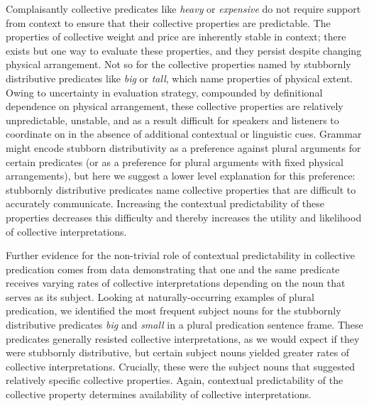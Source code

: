 \documentclass[linguex]{sp}
\begin{document}
Complaisantly collective predicates like \emph{heavy} or \emph{expensive} do not require support from context to ensure that their collective properties are predictable. The properties of collective weight and price are inherently stable in context; there exists but one way to evaluate these properties, and they persist despite changing physical arrangement. Not so for the collective properties named by stubbornly distributive predicates like \emph{big} or \emph{tall}, which name properties of physical extent. Owing to uncertainty in evaluation strategy, compounded by definitional dependence on physical arrangement, these collective properties are relatively unpredictable, unstable, and as a result difficult for speakers and listeners to coordinate on in the absence of additional contextual or linguistic cues. Grammar might encode stubborn distributivity as a preference against plural arguments for certain predicates (or as a preference for plural arguments with fixed physical arrangements), but here we suggest a lower level explanation for this preference: stubbornly distributive predicates name collective properties that are difficult to accurately communicate. Increasing the contextual predictability of these properties decreases this difficulty and thereby increases the utility and likelihood of collective interpretations.

Further evidence for the non-trivial role of contextual predictability in collective predication comes from data demonstrating that one and the same predicate receives varying rates of collective interpretations depending on the noun that serves as its subject. Looking at naturally-occurring examples of plural predication, we identified the most frequent subject nouns for the stubbornly distributive predicates \emph{big} and \emph{small} in a plural predication sentence frame. These predicates generally resisted collective interpretations, as we would expect if they were stubbornly distributive, but certain subject nouns yielded greater rates of collective interpretations. Crucially, these were the subject nouns that suggested relatively specific collective properties. 
Again, contextual predictability of the collective property determines availability of collective interpretations.
\end{document}
